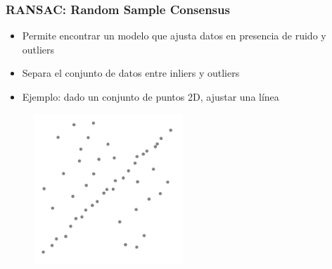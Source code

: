 \begin{frame}
	\frametitle{RANSAC: Random Sample Consensus}
	\footnotesize
	
	\begin{itemize}
		\item Permite encontrar un modelo que ajusta datos en presencia de ruido y outliers
		\item Separa el conjunto de datos entre inliers y outliers
		\item Ejemplo: dado un conjunto de puntos 2D, ajustar una línea 
	\end{itemize}
	
	\begin{figure}
		\includegraphics[width=0.5\textwidth]{./images/ransac_points.pdf}
	\end{figure}

	
\end{frame}


